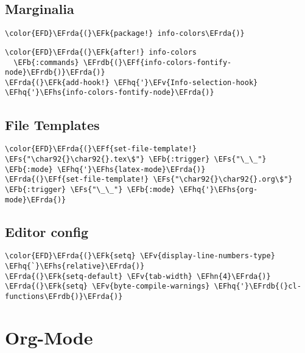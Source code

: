 \documentclass[c]{article}
\theoremstyle{plain}%
\theoremstyle{definition}
\theoremstyle{remark}
\newcommand{\EFs}[1]{\textcolor{EFs}{#1}} %
\newcommand{\EFk}[1]{\textcolor{EFk}{#1}} %
\newcommand{\EFb}[1]{\textcolor{EFb}{#1}} %
\newcommand{\EFf}[1]{\textcolor{EFf}{#1}} %
\newcommand{\EFv}[1]{\textcolor{EFv}{#1}} %
\newcommand{\EFhn}[1]{\textcolor{EFhn}{\textbf{#1}}} %
\newcommand{\EFhq}[1]{\textcolor{EFhq}{#1}} %
\newcommand{\EFhs}[1]{\textcolor{EFhs}{#1}} %
\newcommand{\EFrda}[1]{\textcolor{EFrda}{#1}} %
\newcommand{\EFrdb}[1]{\textcolor{EFrdb}{#1}} %
\begin{document}
\subsection{Marginalia}
\label{sec:orgc900b8e}
\begin{Code}
\begin{Verbatim}
\color{EFD}\EFrda{(}\EFk{package!} info-colors\EFrda{)}
\end{Verbatim}
\end{Code}
\begin{Code}
\begin{Verbatim}
\color{EFD}\EFrda{(}\EFk{after!} info-colors
  \EFb{:commands} \EFrdb{(}\EFf{info-colors-fontify-node}\EFrdb{)}\EFrda{)}
\EFrda{(}\EFk{add-hook!} \EFhq{'}\EFv{Info-selection-hook} \EFhq{'}\EFhs{info-colors-fontify-node}\EFrda{)}
\end{Verbatim}
\end{Code}
\subsection{File Templates}
\label{sec:org738b1e3}
\begin{Code}
\begin{Verbatim}
\color{EFD}\EFrda{(}\EFf{set-file-template!} \EFs{"\char92{}\char92{}.tex\$"} \EFb{:trigger} \EFs{"\_\_"} \EFb{:mode} \EFhq{'}\EFhs{latex-mode}\EFrda{)}
\EFrda{(}\EFf{set-file-template!} \EFs{"\char92{}\char92{}.org\$"} \EFb{:trigger} \EFs{"\_\_"} \EFb{:mode} \EFhq{'}\EFhs{org-mode}\EFrda{)}
\end{Verbatim}
\end{Code}
\subsection{Editor config}
\label{sec:orgadcf484}
\begin{Code}
\begin{Verbatim}
\color{EFD}\EFrda{(}\EFk{setq} \EFv{display-line-numbers-type} \EFhq{`}\EFhs{relative}\EFrda{)}
\EFrda{(}\EFk{setq-default} \EFv{tab-width} \EFhn{4}\EFrda{)}
\EFrda{(}\EFk{setq} \EFv{byte-compile-warnings} \EFhq{'}\EFrdb{(}cl-functions\EFrdb{)}\EFrda{)}
\end{Verbatim}
\end{Code}
\section{Org-Mode}
\label{sec:org1f33946}
\end{document}
